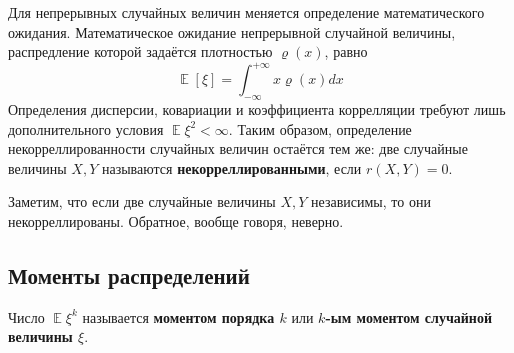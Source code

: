 \documentclass[12pt]{article}
\DeclareMathOperator{\mexp}{\mathbb{E}}
\begin{document}
    Для непрерывных случайных величин меняется определение математического ожидания. Математическое ожидание непрерывной случайной величины, распредление которой задаётся плотностью $\varrho(x)$, равно
    \begin{equation*}
        \mexp[\xi] = \int_{-\infty}^{+\infty} x \varrho(x) dx
    \end{equation*}
    Определения дисперсии, ковариации и коэффициента коррелляции требуют лишь дополнительного условия $\mexp \xi^2 < \infty$. Таким образом, определение некорреллированности случайных величин остаётся тем же: две случайные величины $X,Y$ называются \textbf{некорреллированными}, если $r(X, Y) = 0$. 

    Заметим, что если две случайные величины $X, Y$ независимы, то они некорреллированы. Обратное, вообще говоря, неверно.

    \subsection{Моменты распределений}
    Число $\mexp \xi^k$ называется \textbf{моментом порядка $k$} или \textbf{$k$-ым моментом случайной величины $\xi$}. 
\end{document}
